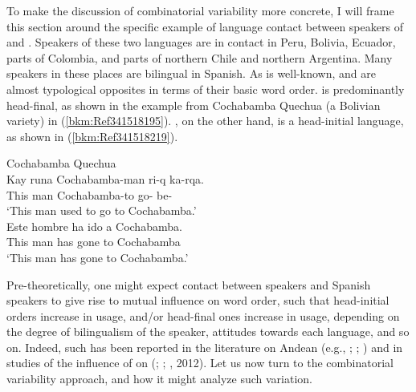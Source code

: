 \documentclass[output=paper]{langsci/langscibook}
\begin{document}
To make the discussion of combinatorial variability more concrete, I will frame
this section around the specific example of language contact between speakers
of  and .  Speakers of these two languages are in contact in
Peru, Bolivia, Ecuador, parts of Colombia, and parts of northern Chile and
northern Argentina. Many  speakers in these places are bilingual in
Spanish.  As is well-known,  and  are almost typological
opposites in terms of their basic word order.  is predominantly
head-final, as shown in the example from Cochabamba Quechua (a Bolivian
variety) in (\ref{bkm:Ref341518195}).  , on the other hand, is a
head-initial language, as shown in (\ref{bkm:Ref341518219}).

\ea\label{bkm:Ref341518195}Cochabamba Quechua\\
    \gll Kay  runa  Cochabamba-man  ri-q ka-rqa.\\
            This man Cochabamba-to go-\Nmlz{} be-\Pst{}\\
    \glt    \enquote*{This man used to go to Cochabamba.}
\ex \label{bkm:Ref341518219}\\
    \gll Este hombre ha ido a Cochabamba.\\
            This  man      has   gone    to  Cochabamba\\
    \glt    \enquote*{This man has gone to Cochabamba.}
\z

Pre-theoretically, one might expect contact between  speakers and
Spanish speakers to give rise to mutual influence on word order, such that
head-initial orders increase in  usage, and/or head-final ones increase
in  usage, depending on the degree of bilingualism of the speaker,
attitudes towards each language, and so on.  Indeed, such has been reported in
the literature on Andean  (e.g., \citealt{Muntendam2008};
\citealt{Muysken1984}; \citealt{Sanchez2003}) and in studies of the influence
of  on  (\citealt{Camacho1999}; \citealt{Hintz2009};
\citealt{Sanchez2003}, 2012).  Let us now turn to the combinatorial variability
approach, and how it might analyze such variation.
\end{document}
